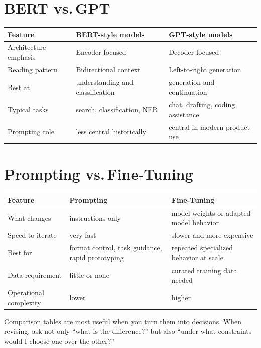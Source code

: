 \documentclass[12pt, a4paper, oneside]{book}
\begin{document}
\section{BERT vs.\,GPT}

\begin{center}
\begin{tabular}{l l l}
\toprule
\textbf{Feature} & \textbf{BERT-style models} & \textbf{GPT-style models} \\
\midrule
Architecture emphasis & Encoder-focused & Decoder-focused \\
Reading pattern & Bidirectional context & Left-to-right generation \\
Best at & understanding and classification & generation and continuation \\
Typical tasks & search, classification, NER & chat, drafting, coding assistance \\
Prompting role & less central historically & central in modern product use \\
\bottomrule
\end{tabular}
\end{center}

\section{Prompting vs.\,Fine-Tuning}

\begin{center}
\begin{tabular}{l l l}
\toprule
\textbf{Feature} & \textbf{Prompting} & \textbf{Fine-Tuning} \\
\midrule
What changes & instructions only & model weights or adapted model behavior \\
Speed to iterate & very fast & slower and more expensive \\
Best for & format control, task guidance, rapid prototyping & repeated specialized behavior at scale \\
Data requirement & little or none & curated training data needed \\
Operational complexity & lower & higher \\
\bottomrule
\end{tabular}
\end{center}

\begin{examtipbox}
Comparison tables are most useful when you turn them into decisions. When revising, ask not only ``what is the difference?'' but also ``under what constraints would I choose one over the other?''
\end{examtipbox}
\end{document}
